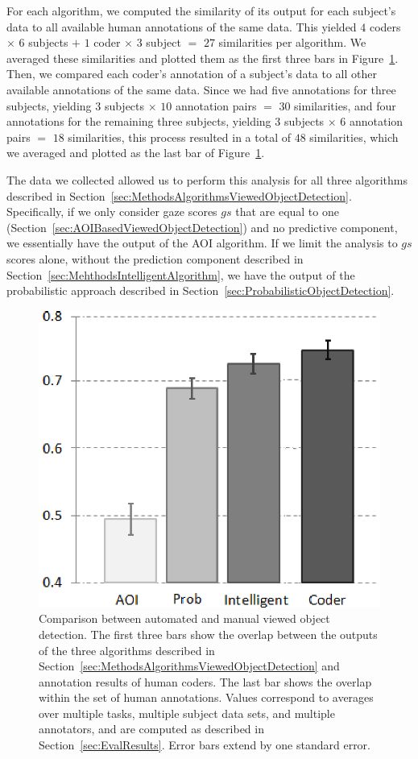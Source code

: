 For each algorithm, we computed the similarity of its output for each subject's data to all available human annotations of the same data.  This yielded $4$ coders $\times$ $6$ subjects $+$  $1$ coder $\times$ $3$ subject $=$ $27$ similarities per algorithm. We averaged these similarities and plotted them as the first three bars in Figure~\ref{fig:quantitative}. Then, we compared each coder's annotation of a subject's data to all other available annotations of the same data. Since we had five annotations for three subjects, yielding $3$ subjects $\times$ $10$ annotation pairs $=$ $30$ similarities, and four annotations for the remaining three subjects, yielding $3$ subjects $\times$ $6$ annotation pairs $=$ $18$ similarities, this process resulted in a total of $48$ similarities, which we averaged and plotted as the last bar of Figure~\ref{fig:quantitative}.

The data we collected allowed us to perform this analysis for all three algorithms described in Section~\ref{sec:MethodsAlgorithmsViewedObjectDetection}. Specifically, if we only consider gaze scores $gs$ that are equal to one (Section~\ref{sec:AOIBasedViewedObjectDetection}) and no predictive component, we essentially have the output of the AOI algorithm. If we limit the analysis to $gs$ scores alone, without the prediction component described in Section~\ref{sec:MehthodsIntelligentAlgorithm}, we have the output of the probabilistic approach described in Section~\ref{sec:ProbabilisticObjectDetection}.

\begin{figure}[htb]
  \centering
  \includegraphics[width=0.6\linewidth]{images/algosComparison.eps}
  \caption{Comparison between automated and manual viewed object detection.
The first three bars show the overlap between the outputs of
the three algorithms described in Section~\ref{sec:MethodsAlgorithmsViewedObjectDetection} and
annotation results of human coders. The last bar shows the overlap
within the set of human annotations. Values correspond to averages
over multiple tasks, multiple subject data sets, and multiple annotators,
and are computed as described in Section~\ref{sec:EvalResults}. Error bars
extend by one standard error. }
	\label{fig:quantitative}
\end{figure}

